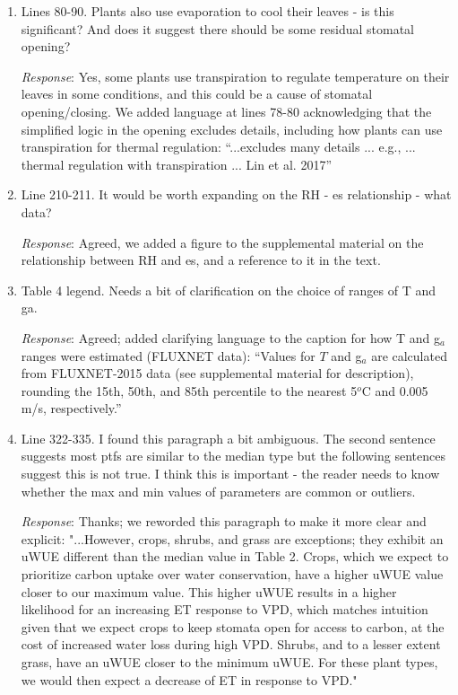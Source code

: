 \documentclass[12pt]{article}
\begin{document}
\begin{enumerate}
\item Lines 80-90. Plants also use evaporation to cool their leaves - is
  this significant? And does it suggest there should be some residual
  stomatal opening?

  \textit{Response}: Yes, some plants use transpiration to regulate
  temperature on their leaves in some conditions, and this could be a
  cause of stomatal opening/closing. We added language at lines 78-80
  acknowledging that the simplified logic in the opening excludes
  details, including how plants can use transpiration for thermal
  regulation: ``...excludes many details ... e.g., ... thermal
  regulation with transpiration ... Lin et al. 2017''

\item Line 210-211. It would be worth expanding on the RH - es
  relationship - what data?

\textit{Response}: Agreed, we added a figure to the supplemental material on
    the relationship between RH and es, and a reference to it in the text.

\item Table 4 legend. Needs a bit of clarification on the choice of ranges
  of T and ga.

  \textit{Response}: Agreed; added clarifying language to the caption
  for how T and g$_a$ ranges were estimated (FLUXNET data): ``Values
  for $T$ and g$_a$ are calculated from FLUXNET-2015 data (see
  supplemental material for description), rounding the 15th, 50th, and
  85th percentile to the nearest 5$^o$C and 0.005 m/s, respectively.''

\item Line 322-335. I found this paragraph a bit ambiguous. The second
  sentence suggests most ptfs are similar to the median type but the
  following sentences suggest this is not true. I think this is
  important - the reader needs to know whether the max and min values
  of parameters are common or outliers.

\textit{Response}: Thanks; we reworded this paragraph to make it more clear and
    explicit: "...However, crops, shrubs, and grass are exceptions; they
    exhibit an uWUE different than the median value in Table 2. Crops,
    which we expect to prioritize carbon uptake over water conservation,
    have a higher uWUE value closer to our maximum value. This higher uWUE
    results in a higher likelihood for an increasing ET response to VPD,
    which matches intuition given that we expect crops to keep stomata
    open for access to carbon, at the cost of increased water loss during
    high VPD. Shrubs, and to a lesser extent grass, have an uWUE closer to
    the minimum uWUE. For these plant types, we would then expect a
    decrease of ET in response to VPD."


\end{enumerate}
\end{document}
